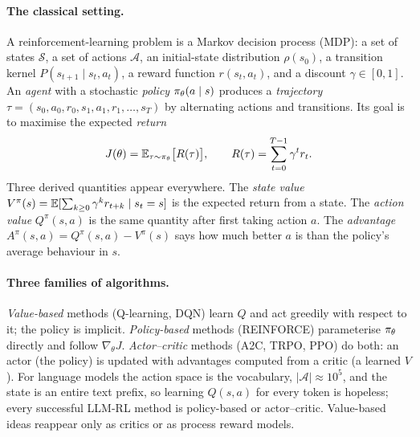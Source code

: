 \paragraph{The classical setting.} A reinforcement-learning problem is a Markov decision
process (MDP): a set of states $\mathcal{S}$, a set of actions $\mathcal{A}$, an initial-state
distribution $\rho(s_0)$, a transition kernel $P(s_{t+1}\mid s_t,a_t)$, a reward function
$r(s_t,a_t)$, and a discount $\gamma\in[0,1]$. An \emph{agent} with a stochastic
\emph{policy} $\pi_\theta(a\mid s)$ produces a \emph{trajectory}
$\tau=(s_0,a_0,r_0,s_1,a_1,r_1,\dots,s_T)$ by alternating actions and transitions. Its goal is
to maximise the expected \emph{return}
\begin{equation}
J(\theta)=\mathbb{E}_{\tau\sim\pi_\theta}\big[R(\tau)\big],\qquad R(\tau)=\sum_{t=0}^{T-1}\gamma^t r_t .
\label{eq:pg:J}
\end{equation}
Three derived quantities appear everywhere. The \emph{state value}
$V^\pi(s)=\mathbb{E}[\sum_{k\ge0}\gamma^k r_{t+k}\mid s_t=s]$ is the expected return from a state. The
\emph{action value} $Q^\pi(s,a)$ is the same quantity after first taking action $a$. The
\emph{advantage} $A^\pi(s,a)=Q^\pi(s,a)-V^\pi(s)$ says how much better $a$ is than the
policy's average behaviour in $s$.

\paragraph{Three families of algorithms.} \emph{Value-based} methods (Q-learning, DQN) learn
$Q$ and act greedily with respect to it; the policy is implicit. \emph{Policy-based} methods
(REINFORCE) parameterise $\pi_\theta$ directly and follow $\nabla_\theta J$. \emph{Actor--critic}
methods (A2C, TRPO, PPO) do both: an actor (the policy) is updated with advantages computed
from a critic (a learned $V$). For language models the action space is the vocabulary,
$|\mathcal{A}|\approx10^5$, and the state is an entire text prefix, so learning $Q(s,a)$
for every token is hopeless; every successful LLM-RL method is policy-based or
actor--critic. Value-based ideas reappear only as critics or as process reward models.

